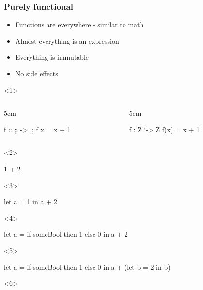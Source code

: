 \documentclass[17pt]{beamer}
\renewcommand{\(}[1]{\begin{columns}[#1]}
\renewcommand{\)}{\end{columns}}
\newcommand{\<}[1]{\begin{column}{#1}}
\renewcommand{\>}{\end{column}}
\begin{document}
\begin{frame}[fragile]
  \frametitle{Purely functional}
  \begin{minipage}[t][.3\textheight]{\textwidth}
  \begin{itemize}
  \item<1-> Functions are everywhere - similar to math
  \item<2-> Almost everything is an expression
  \item<7-> Everything is immutable
  \item<8-> No side effects
  \end{itemize}
  \end{minipage}
  \begin{minipage}[c][.5\textheight]{\textwidth}
  \begin{center}
    \begin{onlyenv}<1>
      \({c}
      \<{5cm}
      \begin{code}[gobble=8]
        f :: ;; -> ;;
        f x = x + 1
      \end{code}
      \>
      \<{5cm}
      \begin{code}[gobble=8]
        f : Z `-> Z
        f(x) = x + 1
      \end{code}
      \>
      \)
    \end{onlyenv}
    \begin{onlyenv}<2>
      \begin{code}[gobble=8]
        1 + 2
      \end{code}
    \end{onlyenv}
    \begin{onlyenv}<3>
      \begin{code}[gobble=8]
        let a = 1
        in  a + 2
      \end{code}
    \end{onlyenv}
    \begin{onlyenv}<4>
      \begin{code}[gobble=8]
        let a = if someBool then 1 else 0
        in  a + 2
      \end{code}
    \end{onlyenv}
    \begin{onlyenv}<5>
      \begin{code}[gobble=8]
        let a = if someBool then 1 else 0
        in  a + (let b = 2 in b)
      \end{code}
    \end{onlyenv}
    \begin{onlyenv}<6>

\end{onlyenv}
\end{center}
\end{minipage}
\end{frame}
\end{document}
